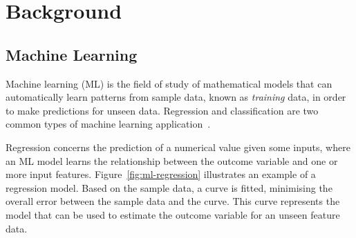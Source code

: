 \chapter{Background}








\section{Machine Learning}

Machine learning (ML) is the field of study of mathematical models that can automatically learn patterns from sample data, known as \textit{training} data, in order to make predictions for unseen data.
Regression and classification are two common types of machine learning application~\cite{goodfellow16}.

Regression concerns the prediction of a numerical value given some inputs, where an ML model learns the relationship between the outcome variable and one or more input features.
Figure~\ref{fig:ml-regression} illustrates an example of a regression model.
Based on the sample data, a curve is fitted, minimising the overall error between the sample data and the curve.
This curve represents the model that can be used to estimate the outcome variable for an unseen feature data.

